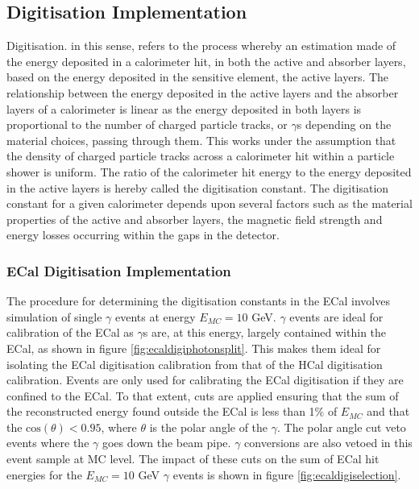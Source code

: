 
\subsection{Digitisation Implementation}
\label{sec:digi}
Digitisation. in this sense, refers to the process whereby an estimation made of the energy deposited in a calorimeter hit, in both the active and absorber layers, based on the energy deposited in the sensitive element, the active layers.  The relationship between the energy deposited in the active layers and the absorber layers of a calorimeter is linear as the energy deposited in both layers is proportional to the number of charged particle tracks, or $\gamma$s depending on the material choices, passing through them.  This works under the assumption that the density of charged particle tracks across a calorimeter hit within a particle shower is uniform.  The ratio of the calorimeter hit energy to the energy deposited in the active layers is hereby called the digitisation constant.  The digitisation constant for a given calorimeter depends upon several factors such as the material properties of the active and absorber layers, the magnetic field strength and energy losses occurring within the gaps in the detector.  


\subsubsection{ECal Digitisation Implementation}
\label{sec:ecaldigi}
The procedure for determining the digitisation constants in the ECal involves simulation of single $\gamma$ events at energy $E_{MC} = 10$ GeV.  $\gamma$ events are ideal for calibration of the ECal as $\gamma$s are, at this energy, largely contained within the ECal, as shown in figure \ref{fig:ecaldigiphotonsplit}.  This makes them ideal for isolating the ECal digitisation calibration from that of the HCal digitisation calibration.  Events are only used for calibrating the ECal digitisation if they are confined to the ECal.  To that extent, cuts are applied ensuring that the sum of the reconstructed energy found outside the ECal is less than 1\% of $E_{MC}$ and that the $\text{cos}(\theta) < 0.95$, where $\theta$ is the polar angle of the $\gamma$.  The polar angle cut veto events where the $\gamma$ goes down the beam pipe.  $\gamma$ conversions are also vetoed in this event sample at MC level.  The impact of these cuts on the sum of ECal hit energies for the $E_{MC} = 10$ GeV $\gamma$ events is shown in figure \ref{fig:ecaldigiselection}.

